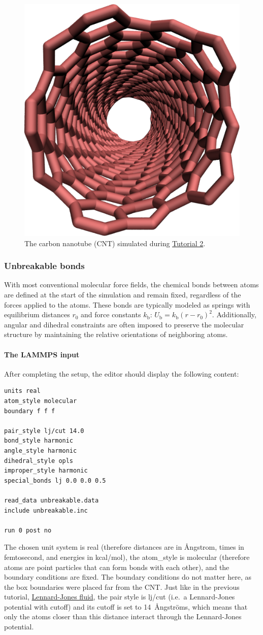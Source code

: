 \documentclass[9pt,tutorial]{livecoms}
\newcommand{\lmpcmd}[1]{\hspace{0pt}\colorbox{listing}{\textcolor{command}{\small{#1}}}\hspace{0pt}} %
\begin{document}
\begin{figure}
\centering
\includegraphics[width=0.55\linewidth]{CNT}
\caption{The carbon nanotube (CNT) simulated during
\hyperref[carbon-nanotube-label]{Tutorial 2}.}
\label{fig:CNT}
\end{figure}

\subsubsection{Unbreakable bonds}

With most conventional molecular force fields, the chemical bonds between
atoms are defined at the start of the simulation and remain fixed, regardless
of the forces applied to the atoms.  These bonds are typically modeled as springs
with equilibrium distances $r_0$ and force constants $k_\text{b}$:
$U_\text{b} = k_\text{b} \left( r - r_0 \right)^2$.  Additionally, angular and
dihedral constraints are often imposed to preserve the molecular structure
by maintaining the relative orientations of neighboring atoms.

\paragraph{The LAMMPS input}

After completing the setup, the editor should display the following content:
\begin{lstlisting}
units real
atom_style molecular
boundary f f f

pair_style lj/cut 14.0
bond_style harmonic
angle_style harmonic
dihedral_style opls
improper_style harmonic
special_bonds lj 0.0 0.0 0.5

read_data unbreakable.data
include unbreakable.inc

run 0 post no
\end{lstlisting}
The chosen unit system is \lmpcmd{real} (therefore distances are in
Ångstrom, times in femtosecond, and energies in kcal/mol), the
\lmpcmd{atom\_style} is \lmpcmd{molecular} (therefore atoms are point particles
that can form bonds with each other), and the boundary conditions are
fixed.  The boundary conditions do not matter here, as the box
boundaries were placed far from the CNT.  Just like in the previous
tutorial, \hyperref[lennard-jones-label]{Lennard-Jones fluid}, the pair
style is \lmpcmd{lj/cut} (i.e.~a Lennard-Jones potential with cutoff)
and its cutoff is set to 14~Ångströms, which means that only the atoms
closer than this distance interact through the Lennard-Jones potential.
\end{document}
